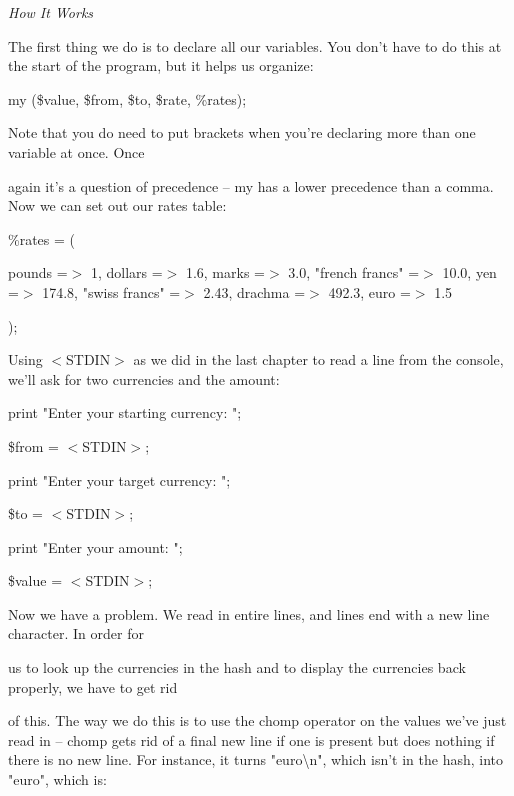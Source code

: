 \documentclass[a4paper,11pt]{book}
\begin{document}
\noindent 

\noindent \textit{How It Works}

\noindent The first thing we do is to declare all our variables. You don't have to do this at the start of the program, but it helps us organize:

\noindent 

\noindent my (\$value, \$from, \$to, \$rate, \%rates);

\noindent 

\noindent 

\noindent Note that you do need to put brackets when you're declaring more than one variable at once. Once

\noindent again it's a question of precedence -- my has a lower precedence than a comma. Now we can set out our rates table:

\noindent 

\noindent 

\noindent \%rates = (

\noindent pounds =$>$ 1, dollars =$>$ 1.6, marks =$>$ 3.0, "french francs" =$>$ 10.0, yen =$>$ 174.8, "swiss francs"  =$>$ 2.43, drachma =$>$ 492.3, euro =$>$ 1.5

\noindent );

\noindent 

\noindent Using $<$STDIN$>$ as we did in the last chapter to read a line from the console, we'll ask for two currencies and the amount:

\noindent 

\noindent 

\noindent print "Enter your starting currency: ";

\noindent \$from = $<$STDIN$>$;

\noindent print "Enter your target currency: ";

\noindent \$to = $<$STDIN$>$;

\noindent print "Enter your amount: ";

\noindent \$value = $<$STDIN$>$;

\noindent 

\noindent Now we have a problem. We read in entire lines, and lines end with a new line character. In order for

\noindent us to look up the currencies in the hash and to display the currencies back properly, we have to get rid

\noindent of this. The way we do this is to use the chomp operator on the values we've just read in -- chomp gets rid of a final new line if one is present but does nothing if there is no new line. For instance, it turns "euro\textbackslash n", which isn't in the hash, into "euro", which is:
\end{document}

